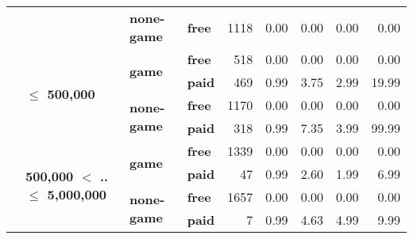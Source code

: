 \begin{tabular}{llll|rrrrr}
\cline{3-9}
      &                                 & \textbf{none-game} & \textbf{free} &   1118 &       0.00 &       0.00 &       0.00 &          0.00 \\
\cline{2-9}
      & \multirow{4}{*}{\textbf{$\leq$ 500,000}} & \multirow{2}{*}{\textbf{game}} & \textbf{free} &    518 &       0.00 &       0.00 &       0.00 &          0.00 \\
      &                                 &           & \textbf{paid} &    469 &       0.99 &       3.75 &       2.99 &         19.99 \\
\cline{3-9}
      &                                 & \multirow{2}{*}{\textbf{none-game}} & \textbf{free} &   1170 &       0.00 &       0.00 &       0.00 &          0.00 \\
      &                                 &           & \textbf{paid} &    318 &       0.99 &       7.35 &       3.99 &         99.99 \\
\cline{2-9}
\cline{3-9}
      & \multirow{4}{*}{\textbf{500,000 $<$ .. $\leq$ 5,000,000}} & \multirow{2}{*}{\textbf{game}} & \textbf{free} &   1339 &       0.00 &       0.00 &       0.00 &          0.00 \\
      &                                 &           & \textbf{paid} &     47 &       0.99 &       2.60 &       1.99 &          6.99 \\
\cline{3-9}
      &                                 & \multirow{2}{*}{\textbf{none-game}} & \textbf{free} &   1657 &       0.00 &       0.00 &       0.00 &          0.00 \\
      &                                 &           & \textbf{paid} &      7 &       0.99 &       4.63 &       4.99 &          9.99 \\
\bottomrule
\end{tabular}
